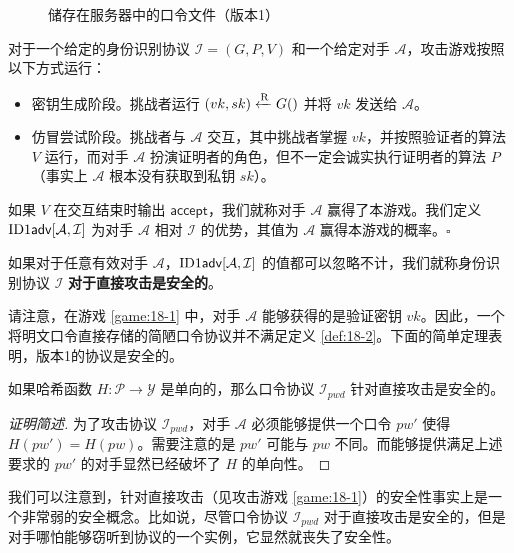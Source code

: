 \begin{figure}
    \centering
    
    \caption{储存在服务器中的口令文件（版本1）}
    \label{fig:18-2}
\end{figure}

\begin{game}[针对直接攻击安全的身份识别]\label{game:18-1}
对于一个给定的身份识别协议 $\mathcal{I}=(G,P,V)$ 和一个给定对手 $\mathcal{A}$，攻击游戏按照以下方式运行：
\begin{itemize}
    \item 密钥生成阶段。挑战者运行 $(vk,sk)\xleftarrow{\rm R} G()$ 并将 $vk$ 发送给 $\mathcal{A}$。
    \item 仿冒尝试阶段。挑战者与 $\mathcal{A}$ 交互，其中挑战者掌握 $vk$，并按照验证者的算法 $V$ 运行，而对手 $\mathcal{A}$ 扮演证明者的角色，但不一定会诚实执行证明者的算法 $P$（事实上 $\mathcal{A}$ 根本没有获取到私钥 $sk$）。
\end{itemize}
如果 $V$ 在交互结束时输出 $\mathsf{accept}$，我们就称对手 $\mathcal{A}$ 赢得了本游戏。我们定义 $\rm{ID1\mathsf{adv}}[\mathcal{A},\mathcal{I}]$ 为对手 $\mathcal{A}$ 相对 $\mathcal{I}$ 的优势，其值为 $\mathcal{A}$ 赢得本游戏的概率。{\hfill $\square$}
\end{game}

\begin{definition}\label{def:18-2}
如果对于任意有效对手 $\mathcal{A}$，$\rm{ID1\mathsf{adv}}[\mathcal{A},\mathcal{I}]$ 的值都可以忽略不计，我们就称身份识别协议 $\mathcal{I}$ \textbf{对于直接攻击是安全的}。
\end{definition}

请注意，在游戏 \ref{game:18-1} 中，对手 $\mathcal{A}$ 能够获得的是验证密钥 $vk$。因此，一个将明文口令直接存储的简陋口令协议并不满足定义 \ref{def:18-2}。下面的简单定理表明，版本1的协议是安全的。

\begin{theorem}\label{theo:18-1}
如果哈希函数 $H:\mathcal{P}\to\mathcal{Y}$ 是单向的，那么口令协议 $\mathcal{I}_{pwd}$ 针对直接攻击是安全的。
\end{theorem}

\begin{proof}[证明简述]
为了攻击协议 $\mathcal{I}_{pwd}$，对手 $\mathcal{A}$ 必须能够提供一个口令 $pw'$ 使得 $H(pw')=H(pw)$。需要注意的是 $pw'$ 可能与 $pw$ 不同。而能够提供满足上述要求的 $pw'$ 的对手显然已经破坏了 $H$ 的单向性。
\end{proof}

我们可以注意到，针对直接攻击（见攻击游戏 \ref{game:18-1}）的安全性事实上是一个非常弱的安全概念。比如说，尽管口令协议 $\mathcal{I}_{pwd}$ 对于直接攻击是安全的，但是对手哪怕能够窃听到协议的一个实例，它显然就丧失了安全性。

